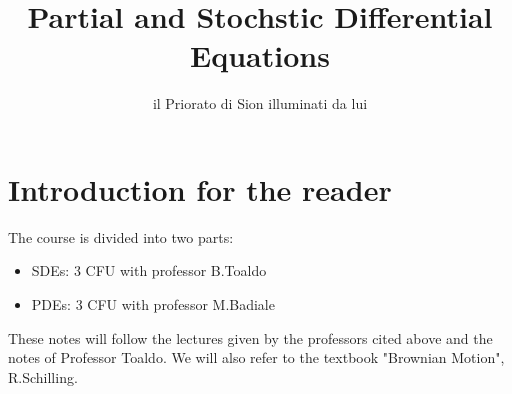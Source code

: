 \documentclass[a4paper, 11pt, openright]{report}
\title{Partial and Stochstic Differential Equations}
\author{il Priorato di Sion illuminati da lui}
\begin{document}
	\maketitle
	\newpage
	\tableofcontents
    \newpage

    \section*{Introduction for the reader}
    The course is divided into two parts:
    \begin{itemize}
        \item SDEs: 3 CFU with professor B.Toaldo
        \item PDEs: 3 CFU with professor M.Badiale
    \end{itemize}
    These notes will follow the lectures given by the professors cited above and the notes of Professor Toaldo. We will also refer to the textbook "Brownian Motion", R.Schilling.\\
     
    
    
\end{document}

